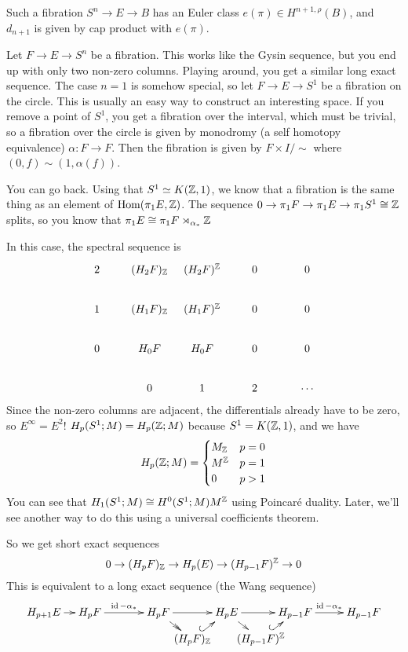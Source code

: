 \begin{remark}
 Such a fibration $S^n\to E\to B$ has an Euler class $e(\pi)\in H^{n+1,\rho}(B)$, and $d_{n+1}$ is given by cap product with $e(\pi)$.
\end{remark}
\begin{example}
 Let $F\to E\to S^n$ be a fibration. This works like the Gysin sequence, but you end up with only two non-zero columns. Playing around, you get a similar long exact sequence. The case $n=1$ is somehow special, so let $F\to E\to S^1$ be a fibration on the circle. This is usually an easy way to construct an interesting space. If you remove a point of $S^1$, you get a fibration over the interval, which must be trivial, so a fibration over the circle is given by monodromy (a self homotopy equivalence) $\alpha\colon F\to F$. Then the fibration is given by $F\times I/\sim$ where $(0,f)\sim (1,\alpha(f))$.
 
 You can go back. Using that $S^1\simeq K(\mathbb{Z},1)$, we know that a fibration is the same thing as an element of $\operatorname{Hom}(\pi_1 E,\mathbb{Z})$. The sequence $0\to \pi_1 F\to \pi_1 E\to \pi_1 S^1\cong \mathbb{Z}$ splits, so you know that $\pi_1 E\cong \pi_1 F\rtimes_{\alpha_*} \mathbb{Z}$
 
 In this case, the spectral sequence is
 \[\xymatrix @!0 @C+2pc @R+1pc{
  2 & (H_2F)_\ZZ & (H_2F)^\ZZ & 0 & 0 \\
  1 & (H_1F)_\ZZ & (H_1F)^\ZZ & 0 & 0 \\
  0 & H_0F & H_0F & 0 & 0\\
  & 0 & 1 & 2 & \cdots
 }\]
 Since the non-zero columns are adjacent, the differentials already have to be zero, so $E^\infty=E^2$! $H_p(S^1;M)=H_p(\mathbb{Z};M)$ because $S^1=K(\mathbb{Z},1)$, and we have
 \[
  H_p(\mathbb{Z};M) =
  \begin{cases}
   M_{\mathbb{Z}} & p=0\\
   M^{\mathbb{Z}} & p=1\\
   0 & p>1
  \end{cases}
 \]
 You can see that $H_1(S^1;M)\cong H^0(S^1;M) M^{\mathbb{Z}}$ using Poincar\'e duality. Later, we'll see another way to do this using a universal coefficients theorem.
 
 So we get short exact sequences
 \[
  0\to (H_pF)_{\mathbb{Z}} \to H_p(E)\to (H_{p-1}F)^{\mathbb{Z}}\to 0
 \]
 This is equivalent to a long exact sequence (the Wang sequence)
 \[\xymatrix @!0 @C+.6pc {
  **[l] H_{p+1}E \ar[r] & H_pF \ar[rr]^-{\id-\alpha_*} && H_p F \ar@{->>}[dr] \ar[rr] & & H_pE \ar[dr]\ar[rr] & & H_{p-1}F \ar[rr]^-{\id-\alpha_*} & & H_{p-1}F\\
  & & & & (H_p F)_\ZZ\ar@{^(->}[ur] & & (H_{p-1} F)^\ZZ \ar@{^(->}[ur]
 }\]
\end{example}


